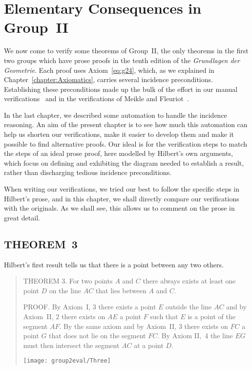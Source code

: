 \chapter{Elementary Consequences in Group~II}\label{chapter:Group2Eval}
We now come to verify some theorems of Group~II, the only theorems in the first two groups which have prose proofs in the tenth edition of the \emph{Grundlagen der Geometrie}. Each proof uses Axiom~\ref{eq:g24}, which, as we explained in Chapter~\ref{chapter:Axiomatics}, carries several incidence preconditions. Establishing these preconditions made up the bulk of the effort in our manual verifications~\cite{ScottMScThesis} and in the verifications of Meikle and Fleuriot~\cite{MeikleFleuriotFormalizingHilbert}.

In the last chapter, we described some automation to handle the incidence reasoning.
An aim of the present chapter is to see how much this automation can help us shorten
our verifications, make it easier to develop them and make it possible to find alternative proofs. Our ideal is for the verification steps to match the steps of an ideal prose proof, here modelled by Hilbert’s own arguments, which focus on defining and exhibiting the diagram needed to establish a result, rather than discharging tedious incidence preconditions.

When writing our verifications, we tried our best to follow the specific steps in Hilbert's prose, and in this chapter, we shall directly compare our verifications with the originals. As we shall see, this allows us to comment on the prose in great detail.

\section{THEOREM~3}\label{sec:Theorem3}
Hilbert's first result tells us that there is a point between any two others.

\begin{quotation}
THEOREM 3. For two points $A$ and $C$ there always exists at least one point $D$ on the line $AC$ that lies between $A$ and $C$.

PROOF. By Axiom~I, 3 there exists a point $E$ outside the line $AC$ and by Axiom~II, 2 there exists on $AE$ a point $F$ such that $E$ is a point of the segment $AF$. By the same axiom and by Axiom~II, 3 there exists on $FC$ a point $G$ that does not lie on the segment $FC$. By Axiom II,~4 the line $EG$ must then intersect the segment $AC$ at a point $D$.

\vspace{0.5cm}
\centering\texttt{[image: group2eval/Three]}
\end{quotation}

